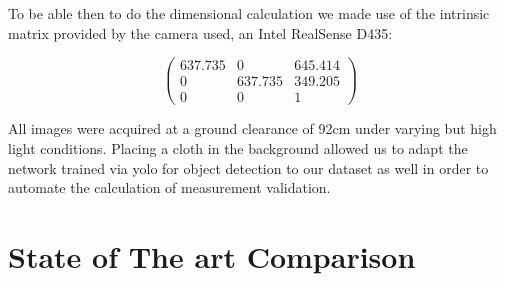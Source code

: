 To be able then to do the dimensional calculation we made use of the intrinsic matrix provided by the camera used, an Intel RealSense D435:

$$
\begin{pmatrix}
    637.735 & 0       & 645.414 \\     
    0       & 637.735 & 349.205 \\
    0       &       0 & 1
\end{pmatrix}
$$

All images were acquired at a ground clearance of 92cm under varying but high light conditions. Placing a cloth in the background allowed us to adapt the network
trained via yolo for object detection to our dataset as well in order to automate the calculation of measurement validation.


\section{State of The art Comparison}



